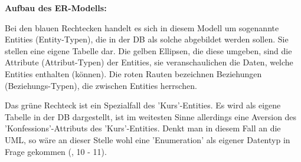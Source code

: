 \textbf{Aufbau des \ac{ER-Modell}s:}

Bei den blauen Rechtecken handelt es sich in diesem Modell um sogenannte Entities (Entity-Typen), die in der \ac{DB} als solche abgebildet werden sollen. Sie stellen eine eigene Tabelle dar. Die gelben Ellipsen, die diese umgeben, sind die Attribute (Attribut-Typen) der Entities, sie veranschaulichen die Daten, welche Entities enthalten (können).
Die roten Rauten bezeichnen Beziehungen (Beziehungs-Typen), die zwischen Entities herrschen.

Das grüne Rechteck ist ein Spezialfall des 'Kurs'-Entities. Es wird als eigene Tabelle in der \ac{DB} dargestellt, ist im weitesten Sinne allerdings eine Aversion des 'Konfessions'-Attributs des 'Kurs'-Entities. Denkt man in diesem Fall an die \ac{UML}, so wäre an dieser Stelle wohl eine 'Enumeration' als eigener Datentyp in Frage gekommen (\cite{BalzertH-UML2}, 10 - 11).


